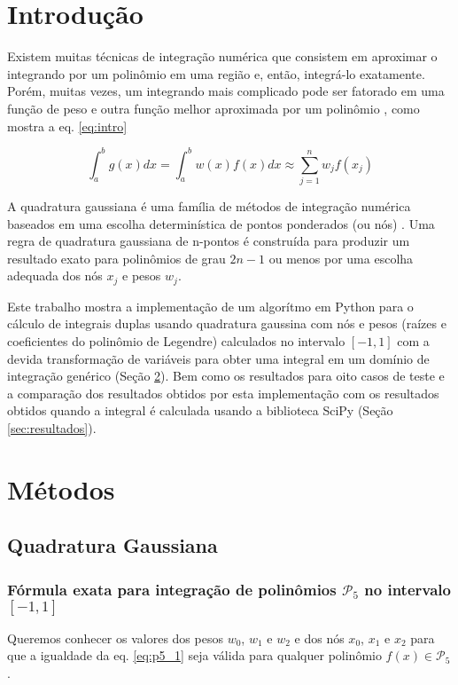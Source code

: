 \documentclass[a4,12pt]{horizon-theme}
\renewcommand{\thefootnote}{\fnsymbol{footnote}}
\begin{document}
\horizonCover

\horizonTitle

\renewcommand{\thefootnote}{\arabic{footnote}}
\hspace{40pt}


\section{Introdução}
Existem muitas técnicas de integração numérica que consistem em aproximar o integrando por um polinômio em uma região e, então, integrá-lo exatamente. Porém, muitas vezes, um integrando mais complicado pode ser fatorado em uma função de peso e outra função melhor aproximada por um polinômio \citep{intro1}, como mostra a eq. \eqref{eq:intro}

\begin{equation}\label{eq:intro}
  \displaystyle\int_a^b g(x)dx = \int_a^b w(x)f(x)dx \approx \sum_{j=1}^n w_jf(x_j)
\end{equation}

A quadratura gaussiana é uma família de métodos de integração numérica baseados em uma escolha determinística de pontos ponderados (ou nós) \citep{intro2}. Uma regra de quadratura gaussiana de n-pontos é construída para produzir um resultado exato para polinômios de grau $2n-1$ ou menos por uma escolha adequada dos nós $x_j$ e pesos $w_j$.

Este trabalho mostra a implementação de um algorítmo em Python \citep{python} para o cálculo de integrais duplas usando quadratura gaussina com nós e pesos (raízes e coeficientes do polinômio de Legendre) calculados no intervalo $[-1, 1]$ com a devida transformação de variáveis para obter uma integral em um domínio de integração genérico (Seção \ref{sec:metodo}). Bem como os resultados para oito casos de teste e a comparação dos resultados obtidos por esta implementação com os resultados obtidos quando a integral é calculada usando a biblioteca SciPy \citep{SciPy} (Seção \ref{sec:resultados}).

\newpage
\section{Métodos}
\label{sec:metodo}

\subsection{Quadratura Gaussiana}

\subsubsection{Fórmula exata para integração de polinômios $\mathcal{P}_5$ no intervalo $[-1, 1]$}
Queremos conhecer os valores dos pesos $w_0$, $w_1$ e $w_2$ e dos nós $x_0$, $x_1$ e $x_2$ para que a igualdade da eq. \eqref{eq:p5_1} seja válida para qualquer polinômio $f(x) \in \mathcal{P}_5$.
\end{document}
